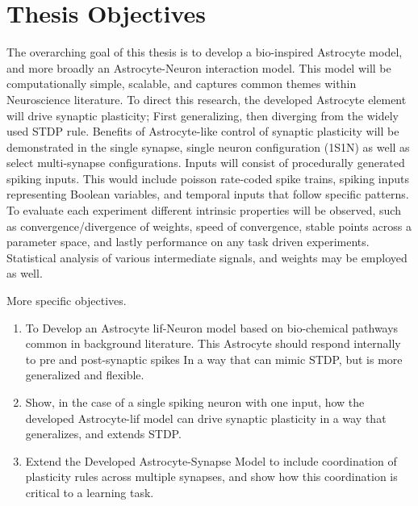 \section{Thesis Objectives}
The overarching goal of this thesis is to develop a bio-inspired Astrocyte
model, and more broadly an Astrocyte-Neuron interaction model. This model will
be computationally simple, scalable, and captures common themes within
Neuroscience literature. To direct this research, the developed Astrocyte
element will drive synaptic plasticity; First generalizing, then diverging from
the widely used STDP rule. Benefits of Astrocyte-like control of synaptic
plasticity will be demonstrated in the single synapse, single neuron
configuration (1S1N) as well as select multi-synapse configurations. Inputs will
consist of procedurally generated spiking inputs. This would include poisson
rate-coded spike trains, spiking inputs representing Boolean variables, and
temporal inputs that follow specific patterns. To evaluate each experiment
different intrinsic properties will be observed, such as convergence/divergence
of weights, speed of convergence, stable points across a parameter space, and
lastly performance on any task driven experiments. Statistical analysis of
various intermediate signals, and weights may be employed as well.

More specific objectives.
\begin{enumerate}
\item To Develop an Astrocyte \Gls{lif}-Neuron model based on bio-chemical pathways
  common in background literature. This Astrocyte should respond internally to
  pre and post-synaptic spikes In a way that can mimic STDP, but is more
  generalized and flexible.

  \item Show, in the case of a single spiking neuron with one input, how the
    developed Astrocyte-\Gls{lif} model can drive synaptic plasticity in a way that
    generalizes, and extends STDP.

  \item Extend the Developed Astrocyte-Synapse Model to include coordination of
    plasticity rules across multiple synapses, and show how this coordination is
    critical to a learning task.

\end{enumerate}
